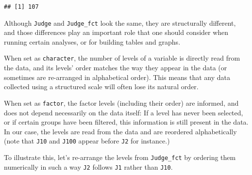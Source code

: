 \documentclass[
]{krantz}
\makeatletter
\newenvironment{Shaded}{\begin{snugshade}}{\end{snugshade}}
\newcommand{\AttributeTok}[1]{\textcolor[rgb]{0.61,0.61,0.61}{#1}}
\newcommand{\ConstantTok}[1]{\textcolor[rgb]{0,0,0}{#1}}
\newcommand{\FunctionTok}[1]{\textcolor[rgb]{0,0,0}{#1}}
\newcommand{\NormalTok}[1]{#1}
\newcommand{\OtherTok}[1]{\textcolor[rgb]{0.37,0.37,0.37}{#1}}
\newcommand{\SpecialCharTok}[1]{\textcolor[rgb]{0,0,0}{#1}}
\renewenvironment{quote}{\begin{VF}}{\end{VF}}
\newenvironment{kframe}{%
\medskip{}
\setlength{\fboxsep}{.8em}
 \def\at@end@of@kframe{}%
 \ifinner\ifhmode%
  \def\at@end@of@kframe{\end{minipage}}%
  \begin{minipage}{\columnwidth}%
 \fi\fi%
 \def\FrameCommand##1{\hskip\@totalleftmargin \hskip-\fboxsep
 \colorbox{shadecolor}{##1}\hskip-\fboxsep
     \hskip-\linewidth \hskip-\@totalleftmargin \hskip\columnwidth}%
 \MakeFramed {\advance\hsize-\width
   \@totalleftmargin\z@ \linewidth\hsize
   \@setminipage}}%
 {\par\unskip\endMakeFramed%
 \at@end@of@kframe}
\renewenvironment{Shaded}{\begin{kframe}}{\end{kframe}}
\makeatother
\begin{document}
\begin{Shaded}
\end{Shaded}

\begin{verbatim}
## [1] 107
\end{verbatim}

\begin{quote}
Although \texttt{Judge} and \texttt{Judge\_fct} look the same, they are structurally different, and those differences play an important role that one should consider when running certain analyses, or for building tables and graphs.
\end{quote}

When set as \texttt{character}, the number of levels of a variable is directly read from the data, and its levels' order matches the way they appear in the data (or sometimes are re-arranged in alphabetical order). This means that any data collected using a structured scale will often lose its natural order.

When set as \texttt{factor}, the factor levels (including their order) are informed, and does not depend necessarily on the data itself: If a level has never been selected, or if certain groups have been filtered, this information is still present in the data. In our case, the levels are read from the data and are reordered alphabetically (note that \texttt{J10} and \texttt{J100} appear before \texttt{J2} for instance.)

To illustrate this, let's re-arrange the levels from \texttt{Judge\_fct} by ordering them numerically in such a way \texttt{J2} follows \texttt{J1} rather than \texttt{J10}.

\begin{Shaded}
\end{Shaded}
\end{document}
